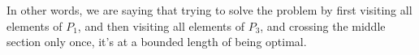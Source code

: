 



In other words, we are saying that trying to solve the problem by first visiting all elements of $P_1$, and then visiting all elements of $P_3$, and crossing the middle section only once, it's at a bounded length of being optimal.

